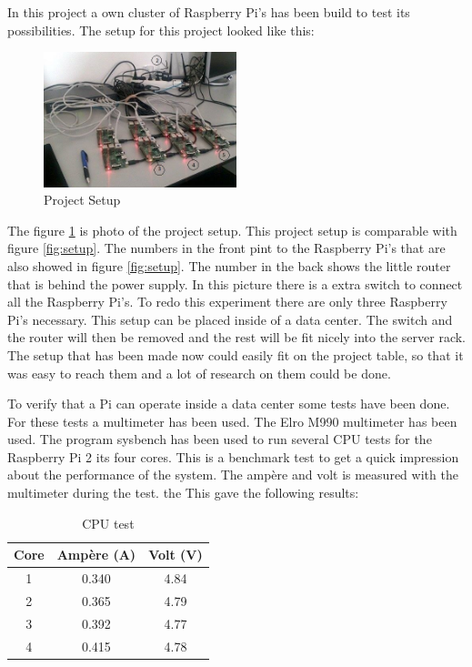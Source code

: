 \documentclass{sig-alternate-br}
\begin{document}
In this project a own cluster of Raspberry Pi's has been build to test its possibilities. The setup for this project looked like this:
\begin{figure}[H]
	\centering 
	\includegraphics[width=0.50\textwidth]{setup.jpg}
	\caption{Project Setup}
	\label{fig:projectsetup} %
\end{figure}
The figure \ref{fig:projectsetup} is photo of the project setup. This project setup is comparable with figure \ref{fig:setup}. The numbers in the front pint to the Raspberry Pi's that are also showed in figure \ref{fig:setup}. The number in the back shows the little router that is behind the power supply. In this picture there is a extra switch to connect all the Raspberry Pi's. To redo this experiment there are only three Raspberry Pi's necessary. \newline 
This setup can be placed inside of a data center. The switch and the router will then be removed and the rest will be fit nicely into the server rack. The setup that has been made now could easily fit on the project table, so that it was easy to reach them and a lot of research on them could be done. 

To verify that a Pi can operate inside a data center some tests have been done. For these tests a multimeter has been used. The Elro M990 multimeter has been used. The program sysbench has been used to run several CPU tests for the Raspberry Pi 2 its four cores. This is a benchmark test to get a quick impression about the performance of the system. The ampère and volt is measured with the multimeter during the test. the This gave the following results:
\begin{table}[H]
	\centering \caption{CPU test}
	\begin{tabular}{|c|c|c|} \hline
		Core & Ampère (A) & Volt (V)\\ \hline
		1 & 0.340 & 4.84 \\ \hline
		2 & 0.365 & 4.79 \\ \hline
		3 & 0.392 & 4.77 \\ \hline
		4 & 0.415 & 4.78 \\ \hline
	\end{tabular}
	\label{tab:cpu}
\end{table}
\end{document}
